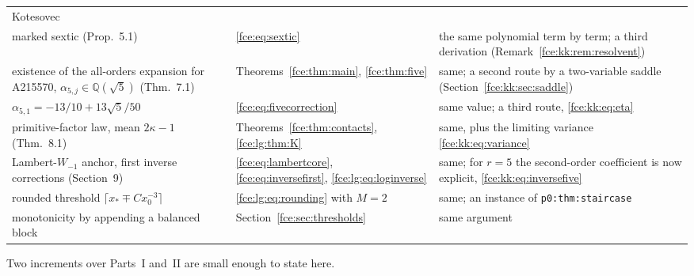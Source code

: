 \documentclass[11pt,a4paper]{article}
\numberwithin{equation}{section}
\theoremstyle{definition}\newtheorem{definition}[theorem]{Definition}
\theoremstyle{remark}\newtheorem{remark}[theorem]{Remark}
\newcommand{\Q}{\mathbb Q}
\begin{document}
{\begin{longtable}{@{}>{\raggedright\arraybackslash}p{}>{\raggedright\arraybackslash}p{}>{\raggedright\arraybackslash}p{}@{}}
 Kotesovec \cite{oeis4}\\
marked sextic (Prop.~5.1) & \eqref{fce:eq:sextic} & the same polynomial
 term by term; a third derivation (Remark~\ref{fce:kk:rem:resolvent})\\
existence of the all-orders expansion for A215570, $\alpha_{5,j}\in\Q(\sqrt5)$
 (Thm.~7.1) & Theorems~\ref{fce:thm:main}, \ref{fce:thm:five} & same; a
 second route by a two-variable saddle
 (Section~\ref{fce:kk:sec:saddle})\\
$\alpha_{5,1}=-13/10+13\sqrt5/50$ & \eqref{fce:eq:fivecorrection} & same
 value; a third route, \eqref{fce:kk:eq:eta}\\
primitive-factor law, mean $2\kappa-1$ (Thm.~8.1) &
 Theorems~\ref{fce:thm:contacts}, \ref{fce:lg:thm:K} & same, plus the
 limiting variance \eqref{fce:kk:eq:variance}\\
Lambert-$W_{-1}$ anchor, first inverse corrections (Section~9) &
 \eqref{fce:eq:lambertcore}, \eqref{fce:eq:inversefirst},
 \eqref{fce:lg:eq:loginverse} & same; for $r=5$ the second-order
 coefficient is now explicit, \eqref{fce:kk:eq:inversefive}\\
rounded threshold $\lceil x_*\mp Cx_0^{-3}\rceil$ & \eqref{fce:lg:eq:rounding}
 with $M=2$ & same; an instance of \texttt{p0:thm:staircase}\\
monotonicity by appending a balanced block & Section~\ref{fce:sec:thresholds}
 & same argument\\
\end{longtable}}

Two increments over Parts~I and~II are small enough to state here.
\end{document}
